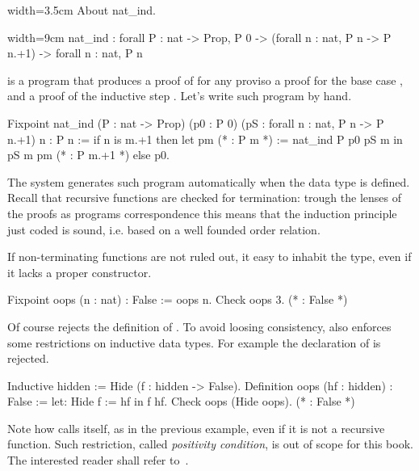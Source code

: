 \begin{coq}{}{width=3.5cm}
About nat_ind.
\end{coq}
\begin{coqout}{}{width=9cm}
nat_ind : forall P : nat -> Prop,
  P 0 -> (forall n : nat, P n -> P n.+1) -> forall n : nat, P n
\end{coqout}
 is a program that produces a proof of  for any 
proviso a proof for the base case , and a proof
of the inductive step .
Let's write such program by hand.

\begin{coq}{}{}
Fixpoint nat_ind (P : nat -> Prop)
  (p0 : P 0) (pS : forall n : nat, P n -> P n.+1) n : P n :=
  if n is m.+1 then
    let pm (* : P m *) := nat_ind P p0 pS m in
    pS m pm (* : P m.+1 *)
  else p0.
\end{coq}

The \Coq{} system generates such program automatically 
when the  data type
is defined.  Recall that recursive functions are checked for termination:
trough the lenses of the proofs as programs correspondence this means
that the induction principle just coded is sound, i.e. based on a well
founded order relation.

If non-terminating functions are not ruled out, it easy to inhabit
the  type, even if it lacks a proper constructor.

\begin{coq}{}{}
Fixpoint oops (n : nat) : False := oops n.
Check oops 3.  (* : False *)
\end{coq}
Of course \Coq{} rejects the definition of .  To avoid
loosing consistency, \Coq{} also enforces some restrictions on
inductive data types.  For example the declaration of 
is rejected.

\begin{coq}{}{}
Inductive hidden := Hide (f : hidden -> False).
Definition oops (hf : hidden) : False := let: Hide f := hf in f hf.
Check oops (Hide oops).  (* : False *)
\end{coq}
Note how  calls itself, as in the previous example,
even if it is not a recursive function.
Such restriction, called
\emph{positivity condition}, is out of scope for this book.
The interested reader shall
refer to~\cite{Coq:manual}.

\label{sec:strongind}


